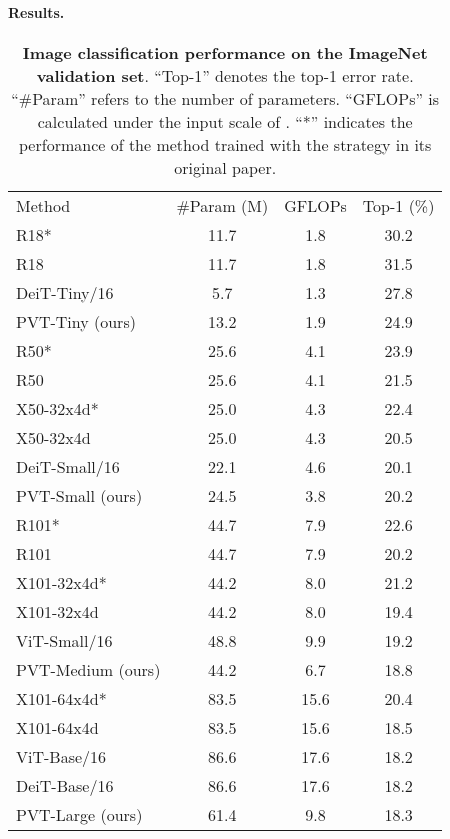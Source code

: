 \documentclass[10pt,twocolumn,letterpaper]{article}
\newlength\savedwidth
\newcommand\whline{\noalign{\global\savedwidth\arrayrulewidth\global\arrayrulewidth 0.8pt}\hline\noalign{\global\arrayrulewidth\savedwidth}}
\begin{document}
\paragraph{Results.}
\begin{table}[t]
    \centering
\setlength{\tabcolsep}{1.0mm}
    \begin{tabular}{l|c|c|c}
Method & \#Param (M) & GFLOPs & Top-1 (\%)  \\
	\whline
R18*~\cite{he2016deep} & 11.7 & 1.8 & 30.2  \\
	R18~\cite{he2016deep}  & 11.7 & 1.8 & 31.5 \\
	DeiT-Tiny/16~\cite{touvron2020training} & 5.7 & 1.3 & 27.8 \\
	\rowcolor{mygray}
	PVT-Tiny (ours) & 13.2 & 1.9 &24.9 \\
	\hline
	R50*~\cite{he2016deep}   &25.6 &4.1 &23.9 \\
	R50~\cite{he2016deep}  &25.6 &4.1 & 21.5 \\
	X50-32x4d*~\cite{xie2017aggregated} &25.0 &4.3 &22.4  \\
	X50-32x4d~\cite{xie2017aggregated} &25.0 &4.3 & 20.5 \\
	DeiT-Small/16~\cite{touvron2020training}  & 22.1 & 4.6 & 20.1 \\
	\rowcolor{mygray}
	PVT-Small (ours)  & 24.5 & 3.8 & 20.2 \\
	\hline
	R101*~\cite{he2016deep}  &44.7 & 7.9 &22.6\\
	R101~\cite{he2016deep}  &44.7 & 7.9 & 20.2\\
	X101-32x4d*~\cite{xie2017aggregated} & 44.2 & 8.0 &21.2 \\
	X101-32x4d~\cite{xie2017aggregated} & 44.2  & 8.0 & 19.4 \\
	ViT-Small/16~\cite{dosovitskiy2020image} & 48.8 & 9.9 & 19.2 \\
	\rowcolor{mygray}
	PVT-Medium (ours) & 44.2 & 6.7 & 18.8\\
	\hline
X101-64x4d*~\cite{xie2017aggregated} & 83.5 & 15.6 & 20.4\\
	X101-64x4d~\cite{xie2017aggregated} & 83.5 & 15.6 & 18.5\\
	ViT-Base/16~\cite{dosovitskiy2020image} & 86.6 & 17.6 & 18.2 \\
	DeiT-Base/16~\cite{touvron2020training} & 86.6 & 17.6 & 18.2 \\
	\rowcolor{mygray}
	PVT-Large (ours) & 61.4 & 9.8 & 18.3 \\
\end{tabular}     \caption{\textbf{Image classification performance on the ImageNet validation set}.
    ``Top-1'' denotes the top-1 error rate.
    ``\#Param'' refers to the number of parameters. ``GFLOPs'' is calculated under the input scale of . ``*'' indicates the performance of the method trained with the strategy in its original paper.}
    \label{tab:cls}
\end{table}
\end{document}
